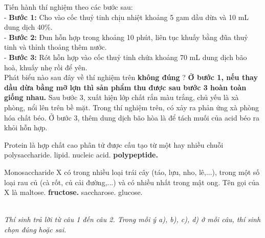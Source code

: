 \documentclass[11pt,a4paper]{article}
\begin{document}
\begin{ex}
Tiến hành thí nghiệm theo các bước sau:\\- \textbf{Bước 1:} Cho vào cốc thuỷ tinh chịu nhiệt khoảng 5 gam dầu dừa và 10 mL dung dịch  40\%.\\- \textbf{Bước 2:} Đun hỗn hợp trong khoảng 10 phút, liên tục khuấy bằng đũa thuỷ tinh và thỉnh thoảng thêm nước.\\- \textbf{Bước 3:} Rót hỗn hợp vào cốc thuỷ tinh chứa khoảng 70 mL dung dịch  bão hoà, khuấy nhẹ rồi để yên.\\Phát biểu nào sau đây về thí nghiệm trên \textbf{không đúng} ?
\choice
{\textbf{\color{hfRed}Ở bước 1, nếu thay dầu dừa bằng mỡ lợn thì sản phẩm thu được sau bước 3 hoàn toàn giống nhau.}}
{Sau bước 3, xuất hiện lớp chất rắn màu trắng, chủ yếu là xà phòng, nổi lên trên bề mặt.}
{Trong thí nghiệm trên, có xảy ra phản ứng xà phòng hóa chất béo.}
{Ở bước 3, thêm dung dịch  bão hòa là để tách muối của acid béo ra khỏi hỗn hợp.}
\end{ex}
\begin{ex}
Protein là hợp chất cao phân tử được cấu tạo từ một hay nhiều chuỗi
\choice
{polysaccharide.}
{lipid.}
{nucleic acid.}
{\textbf{\color{hfRed}polypeptide.}}
\end{ex}
\begin{ex}
Monosaccharide X có trong nhiều loại trái cây (táo, lựu, nho, lê,...), trong một số loại rau củ (cà rốt, củ cải đường,...) và có nhiều nhất trong mật ong. Tên gọi của X là
\choice
{maltose.}
{\textbf{\color{hfRed}fructose.}}
{saccharose.}
{glucose.}
\end{ex}

\vspace{6pt}
 \\
\textit{Thí sinh trả lời từ câu 1 đến câu 2. Trong mỗi ý a), b), c), d) ở mỗi câu, thí sinh chọn đúng hoặc sai.}
\vspace{4pt}
\end{document}
